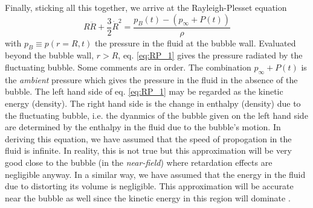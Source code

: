 \documentclass[rmp,aps,nofootinbib,superscriptaddress,floatfix]{revtex4-2}
\begin{document}
Finally, sticking all this together, we arrive at the Rayleigh-Plesset equation \cite{prosperetti1999old,prosperetti1986bubble,leighton2007derivation,plesset1949dynamics,plesset1977bubble}
\begin{equation}
    R\ddot{R}+\frac{3}{2}\dot{R}^2 = \frac{p_B(t)-(p_\infty+P(t))}{\rho}
    \label{eq:RP_1}
\end{equation}
with $p_B \equiv p(r=R,t)$ the pressure in the fluid at the bubble wall. Evaluated beyond the bubble wall, $r > R$, eq. \ref{eq:RP_1} gives the pressure radiated by the fluctuating bubble. Some comments are in order. The combination $p_\infty+P(t)$ is the \emph{ambient} pressure \cite{prosperetti1999old,prosperetti1986bubble} which gives the pressure in the fluid in the absence of the bubble. The left hand side of eq. \ref{eq:RP_1} may be regarded as the kinetic energy (density). The right hand side is the change in enthalpy (density) due to the fluctuating bubble, i.e. the dyanmics of the bubble given on the left hand side are determined by the enthalpy in the fluid due to the bubble's motion. In deriving this equation, we have assumed that the speed of propogation in the fluid is infinite. In reality, this is not true but this approximation will be very good close to the bubble (in the \emph{near-field}) where retardation effects are negligible anyway. In a similar way, we have assumed that the energy in the fluid due to distorting its volume is negligible. This approximation will be accurate near the bubble as well since the kinetic energy in this region will dominate \cite{prosperetti1999old}. 
\end{document}
